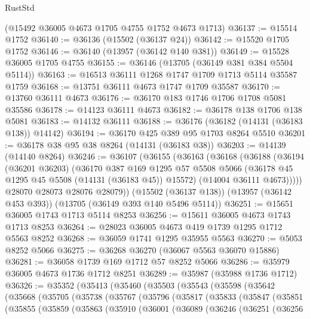 \begin{lexlean}{RustStd}
\begin{coremodule}
    (@15492 @36005 @4673 @1705 @4755 @1752 @4673 @1713)
@36137 := @15514 @1752
@36140 := @36136 (@15502 (@36137 @24))
@36142 := @15520 @1705 @1752
@36146 := @36140 (@13957 (@36142 @140 @381))
@36149 := @15528 @36005 @1705 @4755
@36155 := @36146 (@13705 (@36149 @381 @384 @5504 @5114))
@36163 := @16513 @36111 @1268 @1747 @1709 @1713 @5114 @35587 @1759
@36168 := @13751 @36111 @4673 @1747 @1709 @35587
@36170 := @13760 @36111 @4673
@36176 := @36170 @183 @1746 @1706 @1708 @5081 @35586
@36178 := @14123 @36111 @4673
@36182 := @36178 @138 @1706 @138 @5081
@36183 := @14132 @36111
@36188 := @36176 (@36182 (@14131 (@36183 @138)) @14142)
@36194 := @36170 @425 @389 @95 @1703 @8264 @5510
@36201 := @36178 @38 @95 @38 @8264 (@14131 (@36183 @38))
@36203 := @14139 (@14140 @8264)
@36246 := @36107
    (@36155
      (@36163
        (@36168
          (@36188
            (@36194
              (@36201 @36203)
              (@36170
                @387
                @169
                @1295
                @57
                @5508
                @5066
                (@36178 @45 @1295 @45 @5508 (@14131 (@36183 @45)) @15572)
                (@14004 @36111 @4673)))))
        @28070
        @28073
        @28076
        @28079))
    (@15502 (@36137 @138))
    (@13957 (@36142 @453 @393))
    (@13705 (@36149 @393 @140 @5496 @5114))
@36251 := @15651 @36005 @1743 @1713 @5114 @8253
@36256 := @15611 @36005 @4673 @1743 @1713 @8253
@36264 := @28023 @36005 @4673 @419 @1739 @1295 @1712 @5563 @8252
@36268 := @36059 @1741 @1295 @35955 @5563
@36270 := @5053 @8252 @5066
@36275 := @36268 @36270 (@36067 @5563 @36070 @15886)
@36281 := @36058 @1739 @169 @1712 @57 @8252 @5066
@36286 := @35979 @36005 @4673 @1736 @1712 @8251
@36289 := @35987 (@35988 @1736 @1712)
@36326 := @35352
    (@35413
      (@35460
        (@35503
          (@35543
            (@35598
              (@35642
                (@35668
                  (@35705
                    (@35738
                      (@35767
                        (@35796
                          (@35817
                            (@35833
                              (@35847
                                (@35851
                                  (@35855
                                    (@35859
                                      (@35863
                                        (@35910
                                          (@36001
                                            (@36089
                                              (@36246
                                                (@36251
                                                  (@36256

\end{coremodule}
\end{lexlean}
